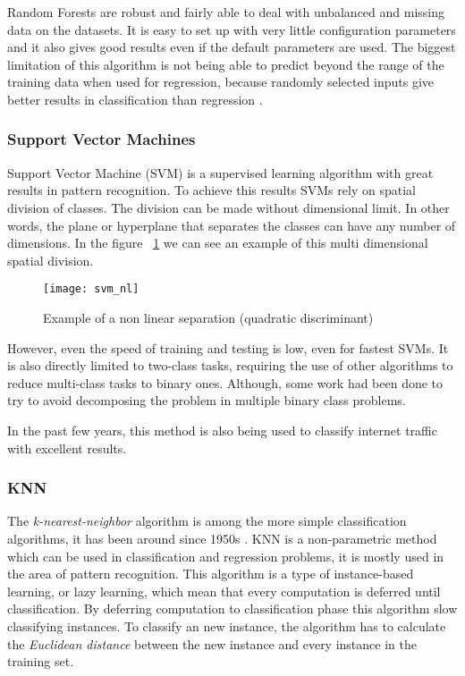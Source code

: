 Random Forests are robust and fairly able to deal with unbalanced and missing data on the datasets. It is easy to set up with very little configuration
parameters and it also gives good results even if the default parameters are used. The biggest limitation of this algorithm is not being able to
predict beyond the range of the training data when used for regression, because randomly selected inputs give better results in classification than regression \cite{raey}.

\subsubsection{Support Vector Machines}

Support Vector Machine (SVM) is a supervised learning algorithm with great results in pattern recognition.
\cite{Cortes95support-vectornetworks} To achieve this results SVMs rely on spatial division of classes. The division can be
made without dimensional limit. In other words, the plane or hyperplane that separates the classes can have any number of dimensions. In the figure
~\ref{fig:svm_nonlin} we can see an example of this multi dimensional spatial division.

\begin{figure}[h]
  \begin{center}
    \leavevmode
    \texttt{[image: svm\_nl]}
    \caption{Example of a non linear separation (quadratic discriminant)\cite{Bennett03supportvector}}
    \label{fig:svm_nonlin}
  \end{center}
\end{figure}

However, even the speed of training and testing is low, even for fastest SVMs.
It is also directly limited to two-class tasks\cite{Cortes95support-vectornetworks},
requiring the use of other algorithms to reduce multi-class tasks to binary ones. Although, some work had been done to try to avoid
decomposing the problem in multiple binary class problems.\cite{Crammer:2002:AIM:944790.944813}

In the past few years, this method is also being used to classify internet traffic with excellent results.\cite{Yuan2010}


\subsubsection{KNN}

The \emph{k-nearest-neighbor} algorithm is among the more simple classification algorithms, it has been around since 1950s \cite[p.348]{HanKam06}.
KNN is a non-parametric method which can be used in classification and regression problems, it is mostly used in the area of pattern recognition.
This algorithm is a type of instance-based learning, or lazy learning, which mean that every computation is deferred until classification. By deferring 
computation to classification phase this algorithm slow classifying instances. To classify an new instance, the algorithm has to calculate
the \emph{Euclidean distance} between the new instance and every instance in the training set.


